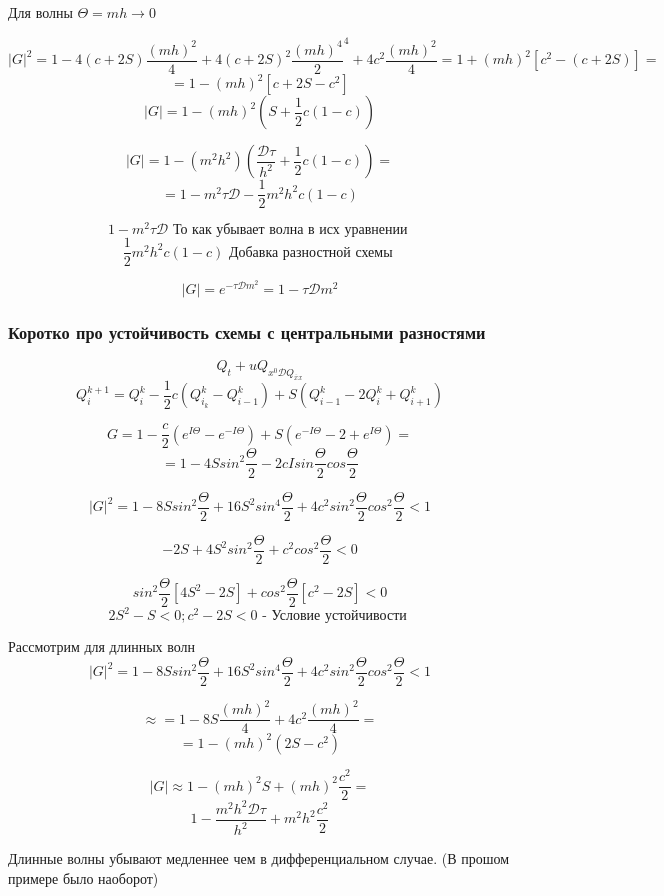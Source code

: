 \documentclass[12pt, a4paper]{article}
\begin{document}
Для волны $ \Theta = mh \rightarrow 0 $

\[ {|G|}^2 = 1 - 4 (c + 2S) \frac{{(mh)}^2}{4} + 4 (c +2S)^2 \frac{{(mh)}^4}{2}^4 + 4c^2 \frac{{(mh)}^2}{4} = 1 + {(mh)}^2 [ c^2 - (c+ 2S)] =  \]
\[ = 1 - (mh)^2 [ c+2S - c^2] \]
\[ |G| = 1 - {(mh)}^2 (S + \frac{1}{2} c(1-c)) \label{eq:1*} \]

\[ |G| = 1 - (m^2 h^2) (\frac{\mathcal{D} \tau}{h^2} + \frac{1}{2} c (1-c)) =  \]
\[ = 1 - m^2 \tau \mathcal{D} - \frac{1}{2} m^2 h^2 c (1-c) \]

\[ 1 - m^2 \tau \mathcal{D}\textrm{ То как убывает волна в исх уравнении } \]
\[ \frac{1}{2} m^2 h^2 c (1-c) \textrm{ Добавка разностной схемы } \]

\[ |G| = e^{-\tau \mathcal{D} m^2} = 1 - \tau \mathcal{D} m^2 \]

\subsubsection{Коротко про устойчивость схемы с центральными разностями}

\[ Q_t + u Q_{x^0  \mathcal{D }Q_{\overline{x }x}} \]
\[ Q^{k+1}_i = Q^k_i - \frac{1}{2} c (Q^k_{i_k} - Q^k_{i-1}) + S(Q_{i-1}^k - 2 Q^k_i + Q_{i+1}^k) \]

\[ G = 1 - \frac{c }{2} (e^{I \Theta} - e^{-I \Theta}) + S(e^{-I\Theta} - 2 + e^{I\Theta}) = \]
\[ = 1- 4 S {sin}^2 \frac{\Theta}{2} -2 c I sin \frac{\Theta}{2} cos\frac{\Theta}{2} \]

\[ {|G|}^2 = 1 - 8 S {sin}^2 \frac{\Theta}{2} + 16 S^2 {sin}^4 \frac{\Theta}{2} + 4c^2 {sin}^2 \frac{\Theta}{2} {cos}^2 \frac{\Theta}{2} < 1\]

\[ -2S+4S^2 {sin}^2 \frac{\Theta}{2} + c^2 {cos}^2 \frac{\Theta}{2} < 0 \]

\[ {sin}^2 \frac{\Theta}{2} [4S^2 - 2S] + {cos}^2 \frac{\Theta}{2}[c^2 - 2S] < 0 \]
\[ 2S^2 - S < 0; c^2-2S < 0 \textrm{ - Условие устойчивости } \]


Рассмотрим для длинных волн
\[ {|G|}^2 = 1 - 8 S {sin}^2 \frac{\Theta}{2} + 16 S^2 {sin}^4 \frac{\Theta}{2} + 4c^2 {sin}^2 \frac{\Theta}{2} {cos}^2 \frac{\Theta}{2} < 1\]

\[ \approx = 1 - 8 S \frac{{(mh)^2}}{4}+ 4 c^2\frac{{(mh)}^2}{4} =  \]
\[ = 1 - {(mh)}^2(2S-c^2) \]

\[ |G| \approx 1 - {(mh)}^2 S + {(mh)}^2 \frac{c^2}{2} =  \]
\[ 1 - \frac{m^2 h^2 \mathcal{D} \tau}{h^2} + m^2 h^2 \frac{c^2}{2} \]

Длинные волны убывают медленнее чем в дифференциальном случае. (В прошом примере было наоборот)
\end{document}
